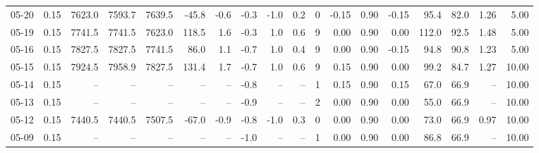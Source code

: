 \begin{threeparttable}
{\begin{tabular}{lrrrrrrrrrrrrrrrrr}
  05-20 &     0.15 & 7623.0 & 7593.7 & 7639.5 &      -45.8 &           -0.6 &                      -0.3 &                     -1.0 &                 0.2 &              0 &      -0.15 &      0.90 &          -0.15 &             95.4 &                82.0 &            1.26 &                   5.00 \\
  05-19 &     0.15 & 7741.5 & 7741.5 & 7623.0 &      118.5 &            1.6 &                      -0.3 &                      1.0 &                 0.6 &              9 &       0.00 &      0.90 &           0.00 &            112.0 &                92.5 &            1.48 &                   5.00 \\
  05-16 &     0.15 & 7827.5 & 7827.5 & 7741.5 &       86.0 &            1.1 &                      -0.7 &                      1.0 &                 0.4 &              9 &       0.00 &      0.90 &          -0.15 &             94.8 &                90.8 &            1.23 &                   5.00 \\
  05-15 &     0.15 & 7924.5 & 7958.9 & 7827.5 &      131.4 &            1.7 &                      -0.7 &                      1.0 &                 0.6 &              9 &       0.15 &      0.90 &           0.00 &             99.2 &                84.7 &            1.27 &                  10.00 \\
  05-14 &     0.15 &     -- &     -- &     -- &         -- &             -- &                      -0.8 &                       -- &                  -- &              1 &       0.15 &      0.90 &           0.15 &             67.0 &                66.9 &              -- &                  10.00 \\
  05-13 &     0.15 &     -- &     -- &     -- &         -- &             -- &                      -0.9 &                       -- &                  -- &              2 &       0.00 &      0.90 &           0.00 &             55.0 &                66.9 &              -- &                  10.00 \\
  05-12 &     0.15 & 7440.5 & 7440.5 & 7507.5 &      -67.0 &           -0.9 &                      -0.8 &                     -1.0 &                 0.3 &              0 &       0.00 &      0.90 &           0.00 &             73.0 &                66.9 &            0.97 &                  10.00 \\
  05-09 &     0.15 &     -- &     -- &     -- &         -- &             -- &                      -1.0 &                       -- &                  -- &              1 &       0.00 &      0.90 &           0.00 &             86.8 &                66.9 &              -- &                  10.00 \\

\end{tabular}}
\end{threeparttable}
